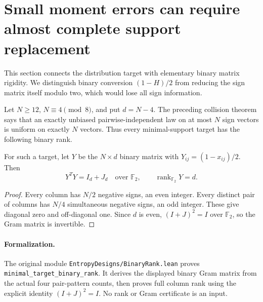 \section{Small moment errors can require almost complete support replacement}
\label{s20:sec:rank-rounding}
This section connects the distribution target with elementary binary
matrix rigidity. We distinguish binary conversion $(1-H)/2$ from
reducing the sign matrix itself modulo two, which would lose all
sign information.

Let $N\ge12$, $N\equiv4\pmod8$, and put $d=N-4$. The preceding
collision theorem says that an exactly unbiased pairwise-independent
law on at most $N$ sign vectors is uniform on exactly $N$ vectors.
Thus every minimal-support target has the following binary rank.

\begin{lemma}
\label{s20:lem:rank-target}
For such a target, let $Y$ be the $N\times d$ binary matrix with
$Y_{ij}=(1-x_{ij})/2$. Then
\[
 Y^TY=I_d+J_d\quad\text{over }\mathbb F_2,
 \qquad \operatorname{rank}_{\mathbb F_2}Y=d.
\]
\end{lemma}
\begin{proof}
Every column has $N/2$ negative signs, an even integer. Every distinct
pair of columns has $N/4$ simultaneous negative signs, an odd integer.
These give diagonal zero and off-diagonal one. Since $d$ is even,
$(I+J)^2=I$ over $\mathbb F_2$, so the Gram matrix is invertible.
\end{proof}

\paragraph{Formalization.}
The original module \texttt{EntropyDesigns/\allowbreak BinaryRank.lean}
proves \texttt{minimal\_\allowbreak target\_\allowbreak binary\_\allowbreak rank}.
It derives the displayed binary Gram matrix from the actual four
pair-pattern counts, then proves full column rank using the explicit
identity $(I+J)^2=I$. No rank or Gram certificate is an input.

